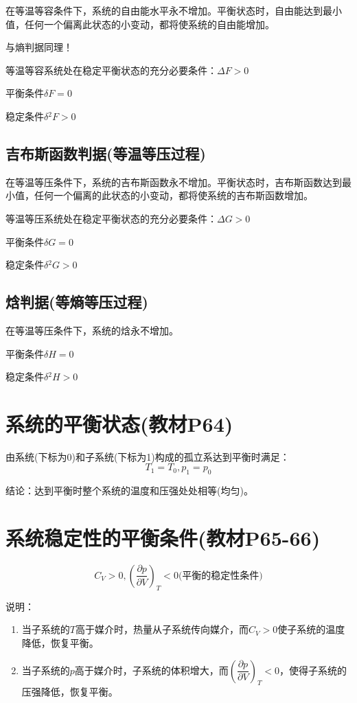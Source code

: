\documentclass[oneside]{ctexbook}
\begin{document}
在等温等容条件下，系统的自由能水平永不增加。平衡状态时，自由能达到最小值，任何一个偏离此状态的小变动，都将使系统的自由能增加。

与熵判据同理！

等温等容系统处在稳定平衡状态的充分必要条件：\(\Delta{}F>0\)

平衡条件\(\delta{}F=0\)

稳定条件\(\delta{}^2F>0\)

\subsection{吉布斯函数判据(等温等压过程)}

在等温等压条件下，系统的吉布斯函数永不增加。平衡状态时，吉布斯函数达到最小值，任何一个偏离的此状态的小变动，都将使系统的吉布斯函数增加。

等温等压系统处在稳定平衡状态的充分必要条件：\(\Delta{}G>0\)

平衡条件\(\delta{}G=0\)

稳定条件\(\delta{}^2G>0\)

\subsection{焓判据(等熵等压过程)}

在等温等压条件下，系统的焓永不增加。

平衡条件\(\delta{}H=0\)

稳定条件\(\delta{}^2H>0\)

\section{系统的平衡状态(教材P64)}

由系统(下标为0)和子系统(下标为1)构成的孤立系达到平衡时满足：
\begin{equation}
T_1=T_0,p_1=p_0
\end{equation}

结论：达到平衡时整个系统的温度和压强处处相等(均匀)。

\section{系统稳定性的平衡条件(教材P65-66)}
\begin{equation}
C_V>0,\left(\dfrac{\partial{}p}{\partial{}V}\right)_T<0\text{(平衡的稳定性条件)}
\end{equation}

说明：
\begin{enumerate}
    \item 当子系统的\(T\)高于媒介时，热量从子系统传向媒介，而\(C_V>0\)使子系统的温度降低，恢复平衡。
    \item 当子系统的\(p\)高于媒介时，子系统的体积增大，而\(\left(\dfrac{\partial{}p}{\partial{}V}\right)_T<0\)，使得子系统的压强降低，恢复平衡。
\end{enumerate}
\end{document}
